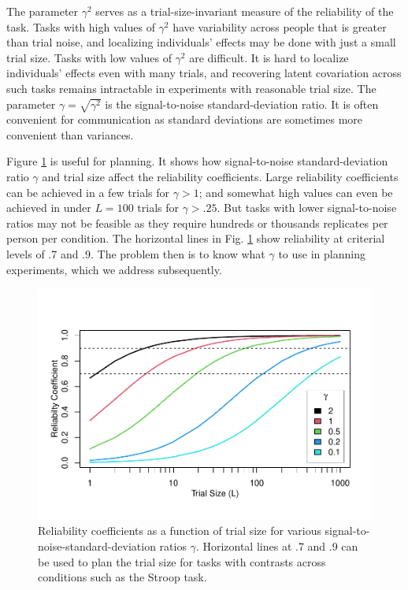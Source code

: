 \documentclass[
  ,man]{apa6}
\begin{document}
The parameter \(\gamma^2\) serves as a trial-size-invariant measure of the reliability of the task. Tasks with high values of \(\gamma^2\) have variability across people that is greater than trial noise, and localizing individuals' effects may be done with just a small trial size. Tasks with low values of \(\gamma^2\) are difficult. It is hard to localize individuals' effects even with many trials, and recovering latent covariation across such tasks remains intractable in experiments with reasonable trial size. The parameter \(\gamma=\sqrt{\gamma^2}\) is the signal-to-noise standard-deviation ratio. It is often convenient for communication as standard deviations are sometimes more convenient than variances.

Figure \ref{fig:rel} is useful for planning. It shows how signal-to-noise standard-deviation ratio \(\gamma\) and trial size affect the reliability coefficients. Large reliability coefficients can be achieved in a few trials for \(\gamma>1\); and somewhat high values can even be achieved in under \(L=100\) trials for \(\gamma>.25\). But tasks with lower signal-to-noise ratios may not be feasible as they require hundreds or thousands replicates per person per condition. The horizontal lines in Fig. \ref{fig:rel} show reliability at criterial levels of .7 and .9. The problem then is to know what \(\gamma\) to use in planning experiments, which we address subsequently.

\begin{figure}
\centering
\includegraphics{p_files/figure-latex/rel-1.pdf}
\caption{\label{fig:rel}Reliability coefficients as a function of trial size for various signal-to-noise-standard-deviation ratios \(\gamma\). Horizontal lines at .7 and .9 can be used to plan the trial size for tasks with contrasts across conditions such as the Stroop task.}
\end{figure}
\end{document}
